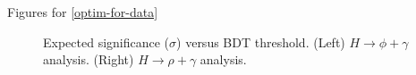 \begin{section}{Figures for \ref{optim-for-data}}

\begin{figure}[htb]
\begin{center}
\quad
{}
\end{center}
\caption{Expected significance ($\sigma$) versus BDT threshold. (Left) $H\rightarrow\phi+\gamma$ analysis. (Right) $H\rightarrow\rho+\gamma$ analysis.}
\label{fig:bdt-data-expsig}
\end{figure}

\end{section}

